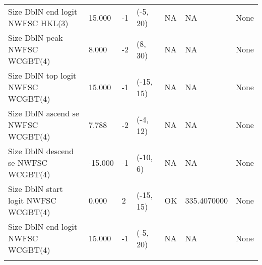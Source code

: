 \documentclass[11pt,
  english,
  a4paper,
]{article}
\begin{document}
\begin{landscape}
\begin{longtable}[t]{>{\raggedright\arraybackslash}p{6cm}lllll>{\raggedright\arraybackslash}p{4cm}}
Size DblN end logit NWFSC HKL(3) & 15.000 & -1 & (-5, 20) & NA & NA & None\\
Size DblN peak NWFSC WCGBT(4) & 8.000 & -2 & (8, 30) & NA & NA & None\\
Size DblN top logit NWFSC WCGBT(4) & 15.000 & -1 & (-15, 15) & NA & NA & None\\
Size DblN ascend se NWFSC WCGBT(4) & 7.788 & -2 & (-4, 12) & NA & NA & None\\
Size DblN descend se NWFSC WCGBT(4) & -15.000 & -1 & (-10, 6) & NA & NA & None\\
Size DblN start logit NWFSC WCGBT(4) & 0.000 & 2 & (-15, 15) & OK & 335.4070000 & None\\
Size DblN end logit NWFSC WCGBT(4) & 15.000 & -1 & (-5, 20) & NA & NA & None\\*
\end{longtable}
\endgroup{}
\end{landscape}
\endgroup{}





\newpage



\newpage



\newpage

\begingroup\fontsize{10}{12}\selectfont
\end{document}
